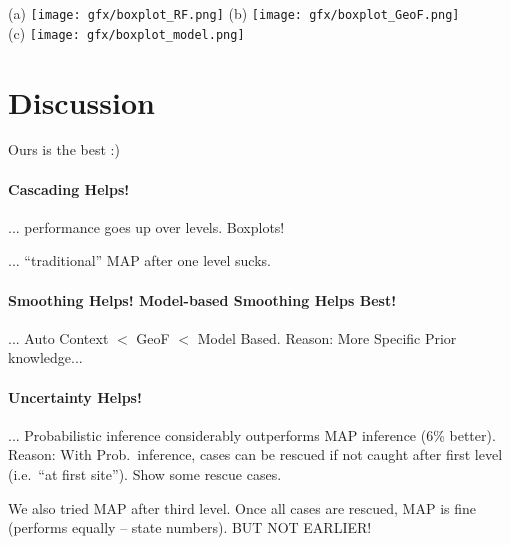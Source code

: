 \documentclass[10pt,twocolumn,letterpaper]{article}
\begin{document}
\begin{figure*}[tb]
\centering
\small
\begin{center}
		(a) \texttt{[image: gfx/boxplot\_RF.png]} %
		(b) \texttt{[image: gfx/boxplot\_GeoF.png]} \\
		(c) \texttt{[image: gfx/boxplot\_model.png]} %
\end{center}
\label{boxplots}
\caption{ %
(a) 2 level cascade, RF output 
%
(b) geodesic smoothing, 1st level
%
(c) model fit}
\end{figure*}

\section{Discussion}
Ours is the best :)

\paragraph{Cascading Helps!}
... performance goes up over levels. Boxplots!

... "`traditional"' MAP after one level sucks. 

\paragraph{Smoothing Helps! Model-based Smoothing Helps Best!}
... Auto Context $<$ GeoF $<$ Model Based. Reason: More Specific Prior knowledge...

\paragraph{Uncertainty Helps!}
... Probabilistic inference considerably outperforms MAP inference (6\% better). Reason: With Prob.\ inference, cases can be rescued if not caught after first level (i.e.\ "`at first site"'). Show some rescue cases. 

We also tried MAP after third level. Once all cases are rescued, MAP is fine (performs equally -- state numbers). BUT NOT EARLIER!
\end{document}
